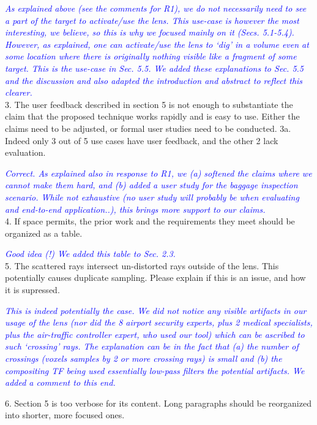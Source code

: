 \documentclass[a4paper,10pt]{article}
\newcommand{\rr}[1]{\emph{\textcolor{blue}{#1}}}
\begin{document}
    \rr{As explained above (see the comments for R1), we do not necessarily need to see a part of the target to activate/use the lens. This use-case is however the most interesting, we believe, so this is why we focused mainly on it (Secs. 5.1-5.4). However, as explained, one can activate/use the lens to `dig' in a volume even at some location where there is originally nothing visible like a fragment of some target. This is the use-case in Sec. 5.5. We added these explanations to Sec. 5.5 and the discussion and also adapted the introduction and abstract to reflect this clearer.}\\
    
    3. The user feedback described in section 5 is not enough to substantiate the
    claim that the proposed technique works rapidly and is easy to use. Either the
    claims need to be adjusted, or formal user studies need to be conducted.
    3a. Indeed only 3 out of 5 use cases have user feedback, and the other 2 lack
    evaluation.
    
    \rr{Correct. As explained also in response to R1, we (a) softened the claims where we cannot make them hard, and (b) added a user study for the baggage inspection scenario. While not exhaustive (no user study will probably be when evaluating and end-to-end application..), this brings more support to our claims.}\\
    
    
    4. If space permits, the prior work and the requirements they meet should be
    organized as a table.
    
    \rr{Good idea (!) We added this table to Sec. 2.3.}\\
    
    5. The scattered rays intersect un-distorted rays outside of the lens. This
    potentially causes duplicate sampling. Please explain if this is an issue, and how
    it is supressed.
    
    \rr{This is indeed potentially the case. We did not notice any visible artifacts in our usage of the lens (nor did the 8 airport security experts, plus 2 medical specialists, plus the air-traffic controller expert, who used our tool) which can be ascribed to such `crossing' rays. The explanation can be in the fact that (a) the number of crossings (voxels samples by 2 or more crossing rays) is small and (b) the compositing TF being used essentially low-pass filters the potential artifacts. We added a comment to this end.}
    
    6. Section 5 is too verbose for its content. Long paragraphs should be reorganized
    into shorter, more focused ones.
    
\end{document}
